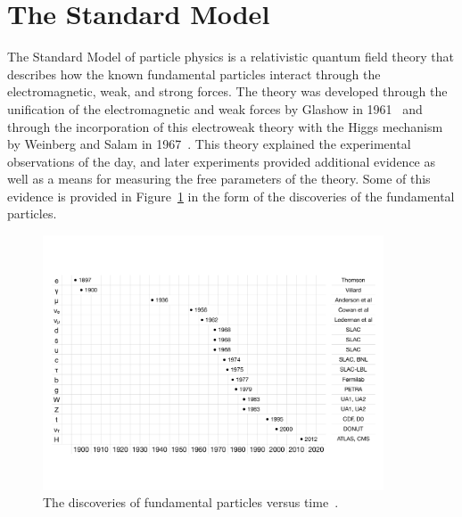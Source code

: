 
\section{The Standard Model\label{sec:SM}}

The Standard Model of particle physics is a relativistic quantum field theory
that describes how the known fundamental particles interact through the electromagnetic, weak,
and strong forces.
The theory was developed through the unification of the electromagnetic and weak forces by Glashow
in 1961~\cite{1961.Glashow.Partial-symmetries} and through the incorporation of this electroweak
theory with the Higgs mechanism by Weinberg and Salam in 1967~\cite{PhysRevLett.19.1264,Salam:1968rm}.
This theory explained the experimental observations of the day, and later experiments provided
additional evidence as well as a means for measuring the free parameters of the theory. Some of
this evidence is provided in Figure~\ref{fig:discoveries} in the form of the discoveries of
the fundamental particles.

\begin{figure}[ht]
 \begin{center}
    \includegraphics[width=0.90\textwidth]{figures/intro/discoveries.pdf}
      \end{center}
\caption{The discoveries of fundamental particles versus time~\cite{Tuna:thesis}.}
\label{fig:discoveries}
\end{figure}

